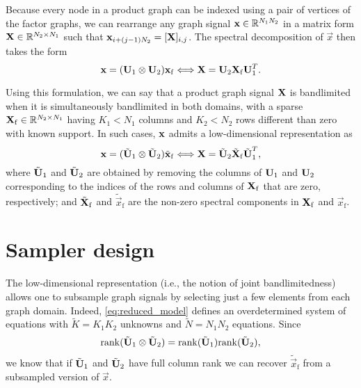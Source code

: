 \documentclass{article}
\begin{document}
Because every node in a product graph can be indexed using a pair of vertices of the factor graphs, we can rearrange any graph signal $\boldsymbol{\mathrm{x}}\in\mathbb{R}^{N_1N_2}$ in a matrix form $\boldsymbol{\mathrm{X}}\in\mathbb{R}^{N_2\times N_1}$ such that $\boldsymbol{\mathrm{x}}_{i+(j-1)N_2}=[\boldsymbol{\mathrm{X}}]_{i,j}$. The spectral decomposition of $\vec{x}$ then takes the form
\begin{equation}
	\boldsymbol{\mathrm{x}}=(\boldsymbol{\mathrm{U}}_1\otimes\boldsymbol{\mathrm{U}}_2)\boldsymbol{\mathrm{x}}_\mathrm{f}\Longleftrightarrow\boldsymbol{\mathrm{X}}=\boldsymbol{\mathrm{U}}_2\boldsymbol{\mathrm{X}}_\mathrm{f}\boldsymbol{\mathrm{U}}_1^T.\label{eq:spectral_2D}
\end{equation}

Using this formulation, we can say that a product graph signal $\boldsymbol{\mathrm{X}}$ is bandlimited when it is simultaneously bandlimited in both domains, with a sparse $\boldsymbol{\mathrm{X}}_\mathrm{f}\in\mathbb{R}^{N_2\times N_1}$ having $K_1<N_1$ columns and $K_2<N_2$ rows different than zero with known support. In such cases, ${\bf x}$ admits a low-dimensional representation as
\begin{equation}
	\boldsymbol{\mathrm{x}}=(\tilde{\boldsymbol{\mathrm{U}}}_1\otimes\tilde{\boldsymbol{\mathrm{U}}}_2)\tilde{\boldsymbol{\mathrm{x}}}_\mathrm{f}\Longleftrightarrow \boldsymbol{\mathrm{X}}=\tilde{\boldsymbol{\mathrm{U}}}_2\tilde{\boldsymbol{\mathrm{X}}}_\mathrm{f}\tilde{\boldsymbol{\mathrm{U}}}_1^T, \label{eq:reduced_model}
\end{equation}
where $\tilde{\boldsymbol{\mathrm{U}}}_1$ and $\tilde{\boldsymbol{\mathrm{U}}}_2$ are obtained by removing the columns of $\boldsymbol{\mathrm{U}}_1$ and $\boldsymbol{\mathrm{U}}_2$ corresponding to the indices of the rows and columns of $\boldsymbol{\mathrm{X}}_\mathrm{f}$ that are zero, respectively; and $\tilde{\boldsymbol{\mathrm{X}}}_\mathrm{f}$ and $\tilde{\vec{x}}_\mathrm{f}$ are the non-zero spectral components in $\boldsymbol{\mathrm{X}}_\mathrm{f}$ and $\vec{x}_\mathrm{f}$. 

\section{Sampler design}

The low-dimensional representation (i.e., the notion of joint bandlimitedness) allows one to subsample graph signals by selecting just a few elements from each graph domain. Indeed, \eqref{eq:reduced_model} defines an overdetermined system of equations with $\tilde{K}=K_1K_2$ unknowns and $\tilde{N}=N_1N_2$ equations. Since
\begin{equation*}
	\mathrm{rank}(\tilde{\boldsymbol{\mathrm{U}}}_1\otimes\tilde{\boldsymbol{\mathrm{U}}}_2)=\mathrm{rank}(\tilde{\boldsymbol{\mathrm{U}}}_1)\mathrm{rank}(\tilde{\boldsymbol{\mathrm{U}}}_2),
\end{equation*}
we know that if $\tilde{\boldsymbol{\mathrm{U}}}_1$ and $\tilde{\boldsymbol{\mathrm{U}}}_2$ have full column rank we can recover $\tilde{\vec{x}}_\mathrm{f}$ from a subsampled version of $\vec{x}$.
\end{document}
